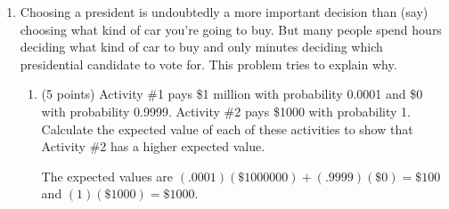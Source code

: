 \documentclass[twoside]{article}
\begin{document}
\begin{enumerate}
\begin{enumerate}
\begin{KEY}
Drivers who move out of slow lanes and into fast lanes slow down the fast lanes and speed up the slow lanes, thereby equalizing traffic speed in the different lanes.
\end{KEY}

    \item \begin{EXAM} (5 points) Many economists believe that a similar logic holds when it comes to making investments for, say, a retirement fund. Describe their investment advice, or otherwise explain. \vspace{1.3in} \end{EXAM}

\begin{KEY}
These economists argue that ``you can't beat the market" (formally, this is called the efficient market hypothesis) and therefore that you should invest in an index fund that buys a little bit of everything. The idea here is that this sort of passively managed fund will have lower management costs than an actively managed fund that tries to beat the market.
\end{KEY}

    \end{enumerate}



\item \begin{EXAM} Choosing a president is undoubtedly a more important decision than (say) choosing what kind of car you're going to buy. But many people spend hours deciding what kind of car to buy and only minutes deciding which presidential candidate to vote for. This problem tries to explain why. \end{EXAM}

    \begin{enumerate}

    \item \begin{EXAM} (5 points) Activity \#1 pays \$1 million with probability 0.0001 and \$0 with probability 0.9999. Activity \#2 pays \$1000 with probability 1. Calculate the expected value of each of these activities to show that Activity \#2 has a higher expected value. \vspace{1.4in} \end{EXAM}

\begin{KEY}
The expected values are $(.0001)(\$1000000)+(.9999)(\$0) = \$100$ and $(1)(\$1000)=\$1000$.
\end{KEY}


\end{enumerate}
\end{enumerate}
\end{document}
